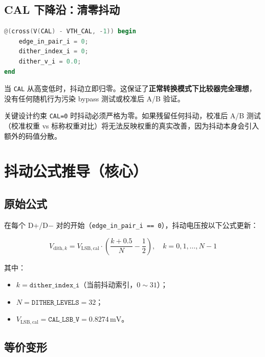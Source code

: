 \documentclass[UTF8,a4paper,11pt]{ctexart}
\newcommand{\Vlsb}{V_{\mathrm{LSB,cal}}}
\newcommand{\code}[1]{\texttt{#1}}
\begin{document}
\subsection{CAL 下降沿：清零抖动}

\begin{lstlisting}[language=Verilog]
@(cross(V(CAL) - VTH_CAL, -1)) begin
    edge_in_pair_i = 0;
    dither_index_i = 0;
    dither_v_i = 0.0;
end
\end{lstlisting}

当 \code{CAL} 从高变低时，抖动立即归零。这保证了\textbf{正常转换模式下比较器完全理想}，没有任何随机行为污染 bypass 测试或校准后 A/B 验证。

\begin{warnbox}{关键设计约束}
\code{CAL=0} 时抖动必须严格为零。如果残留任何抖动，校准后 A/B 测试（校准权重 vs 标称权重对比）将无法反映权重的真实改善，因为抖动本身会引入额外的码值分散。
\end{warnbox}

\section{抖动公式推导（核心）}

\subsection{原始公式}

在每个 D+/D$-$ 对的开始（\code{edge\_in\_pair\_i == 0}），抖动电压按以下公式更新：

\begin{equation}
\boxed{
V_{\mathrm{dith},k} = \Vlsb \cdot \left(\frac{k + 0.5}{N} - \frac{1}{2}\right), \quad k = 0, 1, \ldots, N-1
}
\label{eq:dither_formula}
\end{equation}

其中：
\begin{itemize}[leftmargin=2em]
    \item $k = \code{dither\_index\_i}$（当前抖动索引，$0 \sim 31$）；
    \item $N = \code{DITHER\_LEVELS} = 32$；
    \item $\Vlsb = \code{CAL\_LSB\_V} = 0.8274\,\mathrm{mV}$。
\end{itemize}

\subsection{等价变形}
\end{document}
